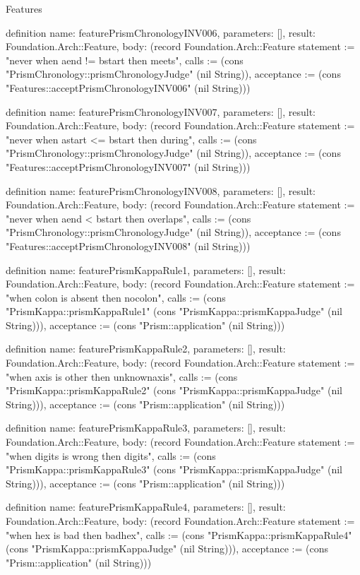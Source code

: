 \begin{lexlean}{Features}
\begin{semanticmodule}
definition{
  name: featurePrismChronologyINV006,
  parameters: [],
  result: Foundation.Arch::Feature,
  body: (record Foundation.Arch::Feature {statement := "never when aend != bstart then meets", calls := (cons "PrismChronology::prismChronologyJudge" (nil String)), acceptance := (cons "Features::acceptPrismChronologyINV006" (nil String))})
}

definition{
  name: featurePrismChronologyINV007,
  parameters: [],
  result: Foundation.Arch::Feature,
  body: (record Foundation.Arch::Feature {statement := "never when astart <= bstart then during", calls := (cons "PrismChronology::prismChronologyJudge" (nil String)), acceptance := (cons "Features::acceptPrismChronologyINV007" (nil String))})
}

definition{
  name: featurePrismChronologyINV008,
  parameters: [],
  result: Foundation.Arch::Feature,
  body: (record Foundation.Arch::Feature {statement := "never when aend < bstart then overlaps", calls := (cons "PrismChronology::prismChronologyJudge" (nil String)), acceptance := (cons "Features::acceptPrismChronologyINV008" (nil String))})
}

definition{
  name: featurePrismKappaRule1,
  parameters: [],
  result: Foundation.Arch::Feature,
  body: (record Foundation.Arch::Feature {statement := "when colon is absent then nocolon", calls := (cons "PrismKappa::prismKappaRule1" (cons "PrismKappa::prismKappaJudge" (nil String))), acceptance := (cons "Prism::application" (nil String))})
}

definition{
  name: featurePrismKappaRule2,
  parameters: [],
  result: Foundation.Arch::Feature,
  body: (record Foundation.Arch::Feature {statement := "when axis is other then unknownaxis", calls := (cons "PrismKappa::prismKappaRule2" (cons "PrismKappa::prismKappaJudge" (nil String))), acceptance := (cons "Prism::application" (nil String))})
}

definition{
  name: featurePrismKappaRule3,
  parameters: [],
  result: Foundation.Arch::Feature,
  body: (record Foundation.Arch::Feature {statement := "when digits is wrong then digits", calls := (cons "PrismKappa::prismKappaRule3" (cons "PrismKappa::prismKappaJudge" (nil String))), acceptance := (cons "Prism::application" (nil String))})
}

definition{
  name: featurePrismKappaRule4,
  parameters: [],
  result: Foundation.Arch::Feature,
  body: (record Foundation.Arch::Feature {statement := "when hex is bad then badhex", calls := (cons "PrismKappa::prismKappaRule4" (cons "PrismKappa::prismKappaJudge" (nil String))), acceptance := (cons "Prism::application" (nil String))})
}


\end{semanticmodule}
\end{lexlean}
